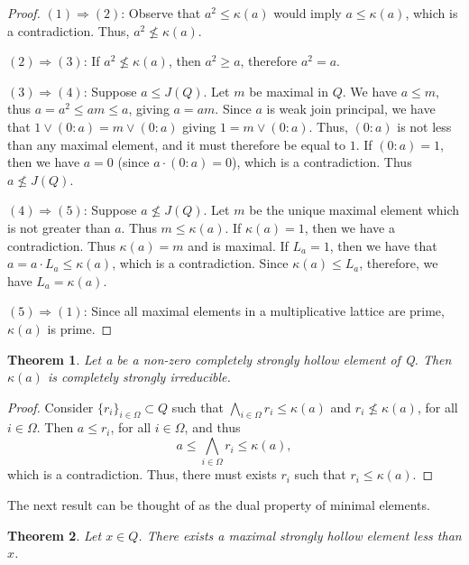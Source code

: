 \documentclass[11pt,english]{amsart}
\newtheorem{theorem}{Theorem}[section]
\theoremstyle{definition}
\numberwithin{equation}{section}
\theoremstyle{remark}
\def\leq{\leqslant}
\begin{document}
	\begin{proof}
		$(1)\Rightarrow (2)$: Observe that $a^2\leq \kappa(a)$ would imply $ a\leq\kappa(a)$, which is a contradiction. Thus, $a^2\nleq \kappa(a)$. 
		
		\((2)\Rightarrow(3)\): If $a^2\nleq \kappa(a)$, then $a^2\geqslant a$, therefore $a^2=a$. 
		
		$(3)\Rightarrow(4)$: Suppose $a\leq J(Q)$. Let $m$ be maximal in $Q$. We have $a\leq m$, thus $a=a^2\leq am\leq a$, giving $a=am$. Since $a$ is weak join principal, we have that $1\vee(0:a)=m\vee(0:a)$ giving $1=m\vee(0:a)$. Thus, $(0:a)$ is not less than any maximal element, and it must therefore be equal to $1$. If $(0:a)=1$, then  we have $a=0$ (since $a\cdot (0:a)=0$), which is a contradiction. Thus $a\nleq J(Q)$. 
		
		\((4)\Rightarrow(5)\): Suppose $a\nleq J(Q)$. Let $m$ be the unique maximal element which is not greater than $a$. Thus $m\leq\kappa(a)$. If $\kappa(a)=1$, then we have a contradiction. Thus $\kappa(a)=m$ and is maximal. If $L_a=1$, then we have that $a=a\cdot L_a\leq\kappa(a)$, which is a contradiction. Since $\kappa(a)\leq L_a$, therefore, we have $L_a=\kappa(a)$.
		
		\((5)\Rightarrow(1)\): Since all maximal elements in a multiplicative lattice are prime, $\kappa(a)$ is prime.
	\end{proof}
	
	\begin{theorem}\label{T2.26}
		Let a be a non-zero completely strongly hollow element of Q. Then $\kappa(a)$ is completely strongly irreducible.
	\end{theorem}
	
	\begin{proof}
		Consider \( \{r_i\}_{i\in \Omega}\subset Q \) such that \(\bigwedge_{i\in \Omega}r_i\leq \kappa(a)\) and $r_i\nleq \kappa(a)$, for all $i\in\Omega$. Then $a\leq r_i$, for all $i\in\Omega$, and thus \[a\leq \bigwedge_{i\in \Omega}r_i\leq \kappa(a), \] which is a contradiction. Thus, there must exists $r_i$ such that $r_i\leq \kappa(a)$.
	\end{proof}
	
	The next result can be thought of as the dual property of minimal elements.
	
	\begin{theorem}
		Let $x\in Q$. There exists a maximal strongly hollow element less than $x$.
	\end{theorem}
	
\end{document}
